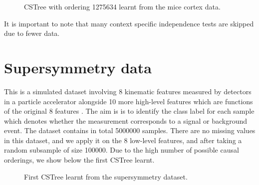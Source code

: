 \documentclass{tufte-book}
\begin{document}
\begin{figure}[!h]\label{fig:mice1}
   \begin{floatrow}
%
\caption{CSTree with ordering 1275634 learnt from the mice cortex data.}
        
   \end{floatrow}
\end{figure}


It is important to note that many context specific independence tests are skipped due to fewer data.



\section{Supersymmetry data}
\label{sec:org481fe88}

This is a simulated dataset involving 8 kinematic features measured by detectors in a particle accelerator alongside 10 more high-level features which are functions of the original 8 features \cite{baldi-2014-searc-exotic}. The aim is is to identify the class label for each sample which denotes whether the measurement corresponds to a signal or background event. The dataset contains in total 5000000 samples. There are no missing values in this dataset, and we apply it on the 8 low-level features, and after taking a random subsample of size 100000. Due to the high number of possible causal orderings, we show below the first CSTree learnt.

\begin{figure}[!h]\label{fig:susy1}
   \begin{floatrow}
%
\caption{First CSTree learnt from the supersymmetry dataset.}
        
   \end{floatrow}
\end{figure}
\end{document}

